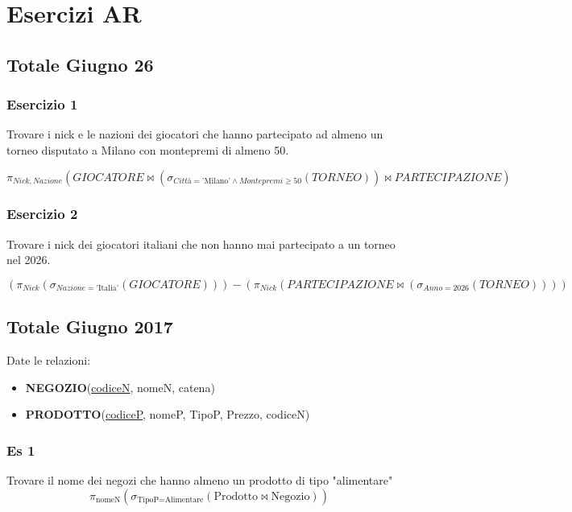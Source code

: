 \chapter{Esercizi AR}
\section{Totale Giugno 26}

\subsection{Esercizio 1}
Trovare i nick e le nazioni dei giocatori che hanno partecipato ad almeno un torneo disputato a Milano con montepremi di almeno 50.

\[
\pi_{Nick, Nazione} \left( GIOCATORE \bowtie \left( \sigma_{Citt\text{à} = \text{'Milano'} \land Montepremi \ge 50} (TORNEO) \right) \bowtie PARTECIPAZIONE \right)
\]

\subsection{Esercizio 2}
Trovare i nick dei giocatori italiani che non hanno mai partecipato a un torneo nel 2026.

\[
\left( \pi_{Nick} \left( \sigma_{Nazione = \text{'Italia'}} (GIOCATORE) \right) \right) - \left( \pi_{Nick} \left( PARTECIPAZIONE \bowtie \left( \sigma_{Anno = 2026} (TORNEO) \right) \right) \right)
\]

\newpage
\section{Totale Giugno 2017}

Date le relazioni:

\begin{center}
    \begin{itemize}
        \item \textbf{NEGOZIO}(\underline{codiceN}, nomeN, catena) \\
        \item \textbf{PRODOTTO}(\underline{codiceP}, nomeP, TipoP, Prezzo, codiceN)
    \end{itemize}
\end{center}

\subsection{Es 1}
Trovare il nome dei negozi che hanno almeno un prodotto di tipo "alimentare"
$$\pi_{\text{nomeN}} ( \sigma_{\text{TipoP} = \text{Alimentare}} ( \text{Prodotto} \bowtie \text{Negozio} ) )$$

